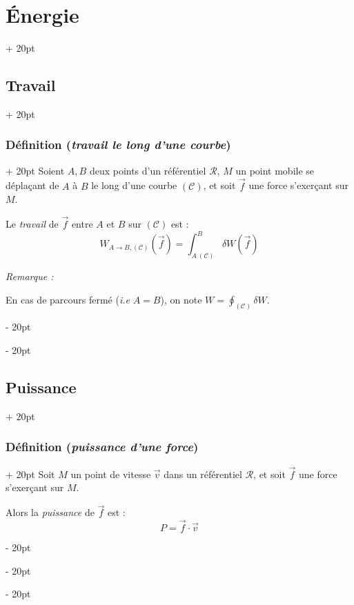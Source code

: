 \documentclass[a4paper, 12pt, twoside]{article}
\newcommand{\lr}[1]{\left( #1 \right)}
\newcommand{\ind}[1][20pt]{\advance\leftskip + #1}
\newcommand{\deind}[1][20pt]{\advance\leftskip - #1}
\newenvironment{indt}[2][20pt]{#2 \par \ind[#1]}{\par \deind} %
\begin{document}
\begin{indt}{\section{\'Energie}}
\begin{indt}{\subsection{Travail}}
            \vspace{12pt}
            
            \begin{indt}{\subsubsection{Définition (\textit{travail le long d'une courbe})}}
                Soient $A, B$ deux points d'un référentiel $\mathscr R$, $M$ un point mobile se déplaçant de $A$ à $B$ le long d'une courbe $(\mathscr C)$, et soit $\vec f$ une force s'exerçant sur $M$.

                Le \textit{travail} de $\vec f$ entre $A$ et $B$ sur $(\mathscr C)$ est :
                \[
                    W_{A \rightarrow B, (\mathscr C)}\!\lr{\vec f}
                    = \int_{A\ (\mathscr C)}^B \delta W\!\lr{\vec f}
                \]

                \vspace{12pt}
                
                \textit{Remarque :}

                En cas de parcours fermé (\textit{i.e} $A = B$), on note $\displaystyle W = \oint_{(\mathscr C)} \delta W$.
            \end{indt}
        \end{indt}

        \vspace{12pt}
        
        \begin{indt}{\subsection{Puissance}}
            \begin{indt}{\subsubsection{Définition (\textit{puissance d'une force})}}
                Soit $M$ un point de vitesse $\vec v$ dans un référentiel $\mathscr R$, et soit $\vec f$ une force s'exerçant sur $M$.

                Alors la \textit{puissance} de $\vec f$ est :
                \[
                    P = \vec f \cdot \vec v
                \]
            \end{indt}

            \vspace{12pt}
            

\end{indt}
\end{indt}
\end{document}
